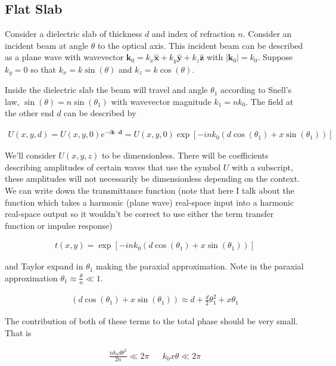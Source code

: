 \documentclass[12pt]{article}
\newcommand{\bv}[1]{\mathbf{#1}}
\begin{document}
\subsection{Flat Slab}

Consider a dielectric slab of thickness $d$ and index of refraction $n$. Consider an incident beam at angle $\theta$ to the optical axis. This incident beam can be described as a plane wave with wavevector $\bv{k}_0 = k_x \hat{\bv{x}} + k_y \hat{\bv{y}} + k_z \hat{\bv{z}}$ with $|\bv{k}_0| = k_0$. Suppose $k_y=0$ so that $k_x = k \sin(\theta)$ and $k_z = k \cos(\theta)$.

Inside the dielectric slab the beam will travel and angle $\theta_1$ according to Snell's law, $\sin(\theta) = n\sin(\theta_1)$ with wavevector magnitude $k_1 = nk_0$. The field at the other end $d$ can be described by

\begin{align}
U(x,y,d) = U(x,y,0) e^{-i \bv{k} \cdot \bv{d}} = U(x,y,0) \exp[-in k_0(d\cos(\theta_1)+x\sin(\theta_1))]
\end{align}

We'll consider $U(x,y,z)$ to be dimensionless. There will be coefficients describing amplitudes of certain waves that use the symbol $U$ with a subscript, these amplitudes will not necessarily be dimensionless depending on the context.
We can write down the transmittance function (note that here I talk about the function which takes a harmonic (plane wave) real-space input into a harmonic real-space output so it wouldn't be correct to use either the term transfer function or impulse response) 

\begin{align}
t(x,y) = \exp[-in k_0(d\cos(\theta_1)+x\sin(\theta_1))]
\end{align}

and Taylor expand in $\theta_1$ making the paraxial approximation. Note in the paraxial approximation $\theta_1 \approx \frac{\theta}{n} \ll 1$.

\begin{align}
(d\cos(\theta_1)+x\sin(\theta_1)) \approx d + \frac{d}{2}\theta_1^2 + x\theta_1
\end{align}

The contribution of both of these terms to the total phase should be very small. That is

\begin{align}
\frac{nk_0d \theta^2}{2n} \ll 2\pi && k_0 x \theta \ll 2\pi
\end{align}
\end{document}
